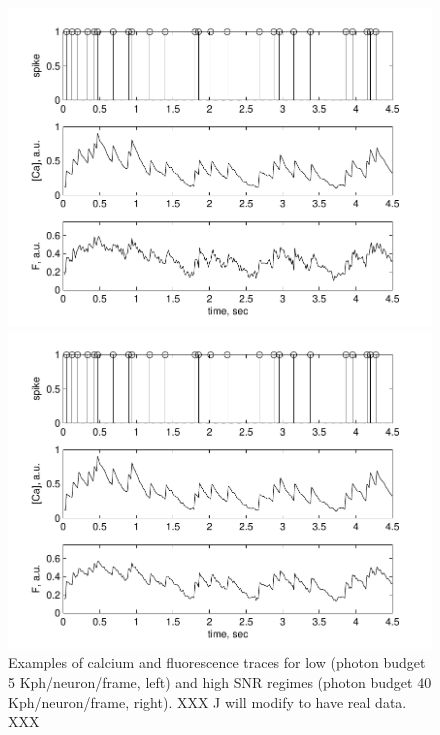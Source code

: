 \begin{figure}
\centering
\begin{minipage}[c]{0.49\hsize}
\includegraphics[width=\hsize]{../figs/Figure0b_fluor_eg_hlowSNR}
\end{minipage}
\begin{minipage}[c]{0.49\hsize}
\includegraphics[width=\hsize]{../figs/Figure0a_fluor_eg_highSNR}
\end{minipage}
\caption{Examples of calcium and fluorescence traces for low (photon budget 5 Kph/neuron/frame, left)
and high SNR regimes (photon budget 40 Kph/neuron/frame, right). XXX J will modify to have real data. XXX}
\label{fig:egfluor}
\end{figure}

